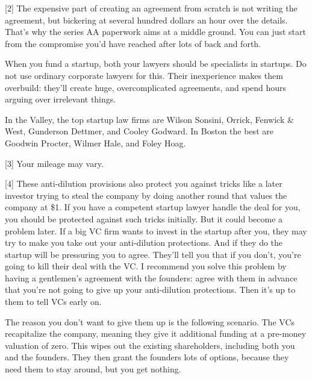 [2] The expensive part of creating an agreement from scratch is
                  not writing the agreement, but bickering at several hundred
                  dollars an hour over the details. That's why the series AA
                  paperwork aims at a middle ground. You can just start from the
                  compromise you'd have reached after lots of back and forth.

When
                  you fund a startup, both your lawyers should be specialists in
                  startups. Do not use ordinary corporate lawyers for this.
                  Their inexperience makes them overbuild: they'll create huge,
                  overcomplicated agreements, and spend hours arguing over
                  irrelevant things.

In the Valley, the top startup
                  law firms are Wilson Sonsini, Orrick, Fenwick \& West,
                  Gunderson Dettmer, and Cooley Godward. In Boston the best are
                  Goodwin Procter, Wilmer Hale, and Foley Hoag.

[3] Your mileage may vary.

[4] These anti-dilution provisions also protect you against
                  tricks like a later investor trying to steal the company by
                  doing another round that values the company at \$1. If you have
                  a competent startup lawyer handle the deal for you, you should
                  be protected against such tricks initially. But it could
                  become a problem later. If a big VC firm wants to invest in
                  the startup after you, they may try to make you take out your
                  anti-dilution protections. And if they do the startup will be
                  pressuring you to agree. They'll tell you that if you don't,
                  you're going to kill their deal with the VC. I recommend you
                  solve this problem by having a gentlemen's agreement with the
                  founders: agree with them in advance that you're not going to
                  give up your anti-dilution protections. Then it's up to them
                  to tell VCs early on.

The reason you don't want to
                  give them up is the following scenario. The VCs recapitalize
                  the company, meaning they give it additional funding at a
                  pre-money valuation of zero. This wipes out the existing
                  shareholders, including both you and the founders. They then
                  grant the founders lots of options, because they need them to
                  stay around, but you get nothing.

